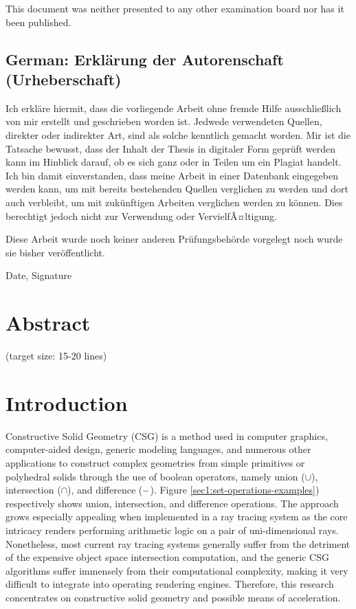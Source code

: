\documentclass[a4paper,11pt,oneside]{article}
\newcommand{\minus}{\scalebox{0.9}[1.0]{$-$}} %
\begin{document}
This document was neither presented to any other examination board
nor has it been published.

\subsection*{German: Erklärung der Autorenschaft (Urheberschaft)}
 
Ich erkläre hiermit, dass die vorliegende Arbeit ohne fremde Hilfe
ausschließlich von mir erstellt und geschrieben worden ist. Jedwede
verwendeten Quellen, direkter oder indirekter Art, sind als solche
kenntlich gemacht worden. Mir ist die Tatsache bewusst, dass der
Inhalt der Thesis in digitaler Form geprüft werden kann im Hinblick
darauf, ob es sich ganz oder in Teilen um ein Plagiat handelt. Ich
bin damit einverstanden, dass meine Arbeit in einer Datenbank
eingegeben werden kann, um mit bereits bestehenden Quellen
verglichen zu werden und dort auch verbleibt, um mit zukünftigen
Arbeiten verglichen werden zu können. Dies berechtigt jedoch nicht
zur Verwendung oder VervielfÃ¤ltigung.

Diese Arbeit wurde noch keiner anderen Prüfungsbehörde vorgelegt
noch wurde sie bisher veröffentlicht.

\vspace{20mm}

Date, Signature

\newpage

\section*{Abstract}
  
   
  
(target size: 15-20 lines)

\newpage
\tableofcontents

\clearpage
{}

\section{Introduction}
  
Constructive Solid Geometry (CSG) is a method used in computer graphics, computer-aided design, generic modeling languages, and numerous other applications to construct complex geometries from simple primitives or polyhedral solids through the use of boolean operators, namely union ($\cup$),  intersection ($\cap$), and difference ($\minus$). Figure \ref{sec1:set-operations-examples}) respectively shows union, intersection, and difference operations. The approach grows especially appealing when implemented in a ray tracing system as the core intricacy renders performing arithmetic logic on a pair of uni-dimensional rays. Nonetheless, most current ray tracing systems generally suffer from the detriment of the expensive object space intersection computation, and the generic CSG algorithms suffer immensely from their computational complexity, making it very difficult to integrate into operating rendering engines. Therefore, this research concentrates on constructive solid geometry and possible means of acceleration.
  
\end{document}
